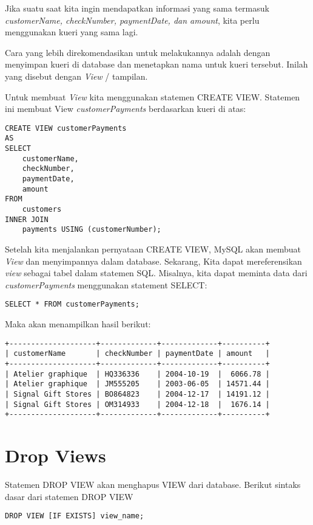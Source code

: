 \documentclass[a4paper]{article}
\begin{document}
Jika suatu saat kita ingin mendapatkan informasi yang sama termasuk \textit{customerName, checkNumber, paymentDate, dan amount}, kita perlu menggunakan kueri yang sama lagi.

Cara yang lebih direkomendasikan untuk melakukannya adalah dengan menyimpan kueri di database dan menetapkan nama untuk kueri tersebut. Inilah yang disebut dengan \textit{View} / tampilan.

Untuk membuat \textit{View} kita menggunakan statemen CREATE VIEW. Statemen ini membuat View \textit{customerPayments} berdasarkan kueri di atas:

\begin{lstlisting}
CREATE VIEW customerPayments
AS 
SELECT 
    customerName, 
    checkNumber, 
    paymentDate, 
    amount
FROM
    customers
INNER JOIN
    payments USING (customerNumber);
\end{lstlisting}


Setelah kita menjalankan pernyataan CREATE VIEW, MySQL akan membuat \textit{View} dan menyimpannya dalam database. Sekarang, Kita dapat mereferensikan \textit{view} sebagai tabel dalam statemen SQL. Misalnya, kita dapat meminta data dari \textit{customerPayments} menggunakan statement SELECT:

\begin{lstlisting}
SELECT * FROM customerPayments;
\end{lstlisting}


Maka akan menampilkan hasil berikut:
\begin{lstlisting}
+--------------------+-------------+-------------+----------+
| customerName       | checkNumber | paymentDate | amount   |
+--------------------+-------------+-------------+----------+
| Atelier graphique  | HQ336336    | 2004-10-19  |  6066.78 |
| Atelier graphique  | JM555205    | 2003-06-05  | 14571.44 |
| Signal Gift Stores | BO864823    | 2004-12-17  | 14191.12 |
| Signal Gift Stores | OM314933    | 2004-12-18  |  1676.14 |
+--------------------+-------------+-------------+----------+
\end{lstlisting}

\section{Drop Views}%
\label{sec:section_name}

Statemen DROP VIEW akan menghapus VIEW dari database. Berikut sintaks dasar dari statemen DROP VIEW


\begin{lstlisting}
DROP VIEW [IF EXISTS] view_name;
\end{lstlisting}
\end{document}
